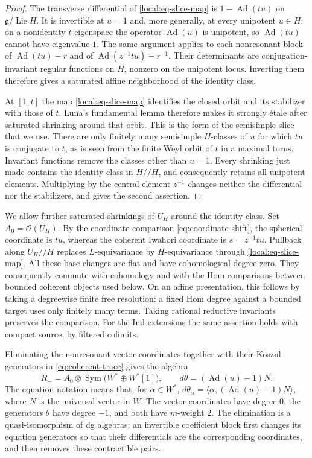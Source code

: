 \documentclass[11pt]{article}
\numberwithin{equation}{section}
\theoremstyle{definition}
\theoremstyle{remark}
\newcommand{\g}{\mathfrak g}
\newcommand{\cO}{\mathcal O}
\newcommand{\Ad}{\operatorname{Ad}}
\newcommand{\Lie}{\operatorname{Lie}}
\newcommand{\Sym}{\operatorname{Sym}}
\begin{document}
\begin{proof}
The transverse differential of \eqref{local:eq-slice-map} is
$1-\Ad(tu)$ on $\g/\Lie H$.  It is invertible at $u=1$ and,
more generally, at every unipotent $u\in H$: on a nonidentity
$t$-eigenspace the operator $\Ad(u)$ is unipotent, so $\Ad(tu)$
cannot have eigenvalue $1$.  The same argument applies to each
nonresonant block of $\Ad(tu)-r$ and of
$\Ad(z^{-1}tu)-r^{-1}$.  Their determinants are conjugation-invariant
regular functions on $H$, nonzero on the unipotent locus.  Inverting
them therefore gives a saturated affine neighborhood of the identity
class.

At $[1,t]$ the map \eqref{local:eq-slice-map} identifies the closed
orbit and its stabilizer with those of $t$.  Luna's fundamental lemma
\cite[fundamental lemma]{Local:Luna}
therefore makes it strongly \'etale after saturated shrinking around
that orbit.  This is the form of the semisimple slice that we use.
There are only finitely many semisimple $H$-classes of $u$ for which
$tu$ is conjugate to $t$, as is seen from the finite Weyl orbit of
$t$ in a maximal torus.  Invariant functions remove the classes other
than $u=1$.  Every shrinking just made contains the identity class in
$H/\!/H$, and consequently retains all unipotent elements.  Multiplying
by the central element $z^{-1}$ changes neither the differential nor
the stabilizers, and gives the second assertion.
\end{proof}

We allow further saturated shrinkings of $U_H$ around the identity
class.  Set $A_0=\cO(U_H)$.  By the coordinate comparison
\eqref{eq:coordinate-shift}, the spherical coordinate is $tu$, whereas
the coherent Iwahori coordinate is $s=z^{-1}tu$.  Pullback along
$U_H/\!/H$ replaces $L$-equivariance by $H$-equivariance through
\eqref{local:eq-slice-map}.  All these base changes are flat and have
cohomological degree zero.  They consequently commute with cohomology
and with the Hom comparisons between bounded coherent objects used
below.  On an affine presentation, this follows by taking a
degreewise finite free resolution: a fixed Hom degree against a
bounded target uses only finitely many terms.  Taking rational reductive
invariants preserves the comparison.  For the Ind-extensions the same
assertion holds with compact source, by filtered colimits.

Eliminating the nonresonant vector coordinates together with their
Koszul generators in \eqref{eq:coherent-trace} gives the algebra
\begin{equation}\label{local:eq-negative-algebra}
 R_-=A_0\otimes\Sym\bigl(W^*\oplus W^*[1]\bigr),
 \qquad d\theta=(\Ad(u)-1)N.
\end{equation}
The equation notation means that, for $\alpha\in W^*$,
$d\theta_\alpha=\langle\alpha,(\Ad(u)-1)N\rangle$, where
$N$ is the universal vector in $W$.  The vector coordinates have
degree $0$, the generators $\theta$ have degree $-1$, and both have
$m$-weight $2$.  The elimination is a quasi-isomorphism of dg algebras:
an invertible coefficient block first changes its equation generators
so that their differentials are the corresponding coordinates, and
then removes these contractible pairs.
\end{document}
